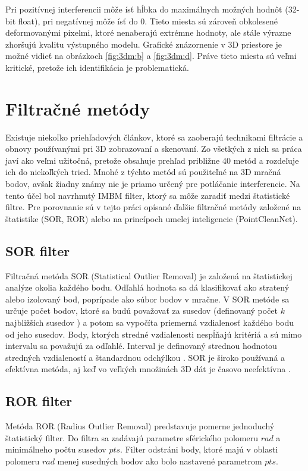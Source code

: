 Pri pozitívnej interferencii môže ísť hĺbka do maximálnych možných hodnôt (32-bit float), pri negatívnej môže ísť do 0. Tieto miesta sú zároveň obkolesené deformovanými pixelmi, ktoré nenaberajú extrémne hodnoty, ale stále výrazne zhoršujú kvalitu výstupného modelu. Grafické znázornenie v 3D priestore je možné vidieť na obrázkoch \ref{fig:3dm:b} a \ref{fig:3dm:d}. Práve tieto miesta sú veľmi kritické, pretože ich identifikácia je problematická. 

\section{Filtračné metódy}
\label{sec:filtmethods}

Existuje niekoľko priehľadových článkov, ktoré sa zaoberajú technikami filtrácie a obnovy používanými pri 3D zobrazovaní a skenovaní. Zo všetkých z nich sa práca \cite{Han} javí ako veľmi užitočná, pretože obsahuje prehľad približne 40 metód a rozdeľuje ich do niekoľkých tried. Mnohé z týchto metód sú použiteľné na 3D mračná bodov, avšak žiadny známy nie je priamo určený pre potláčanie interferencie. Na tento účel bol navrhnutý IMBM filter, ktorý sa môže zaradiť medzi štatistické filtre. Pre porovnanie sú v tejto práci opísané ďalšie filtračné metódy založené na štatistike (SOR, ROR) alebo na princípoch umelej inteligencie (PointCleanNet).   

\subsection{SOR filter}

Filtračná metóda SOR (Statistical Outlier Removal) je založená na štatistickej analýze okolia každého bodu. Odľahlá hodnota sa dá klasifikovať ako stratený alebo izolovaný bod, poprípade ako súbor bodov v mračne. V SOR metóde sa určuje počet bodov, ktoré sa budú považovať za susedov (definovaný počet $k$ najbližších susedov \cite{Pirate}) a potom sa vypočíta priemerná vzdialenosť každého bodu od jeho susedov. Body, ktorých stredné vzdialenosti nespĺňajú kritériá a sú mimo intervalu sa považujú za odľahlé. Interval je definovaný strednou hodnotou stredných vzdialeností a štandardnou odchýlkou \cite{Corso}. SOR je široko používaná a efektívna metóda, aj keď vo veľkých množinách 3D dát je časovo neefektívna  \cite{Balite}.

\subsection{ROR filter}
Metóda ROR (Radius Outlier Removal) predstavuje pomerne jednoduchý štatistický filter. Do filtra sa zadávajú parametre sférického polomeru $rad$ a minimálneho počtu susedov $pts$. Filter odstráni body, ktoré majú v oblasti polomeru $rad$ menej susedných bodov ako bolo nastavené parametrom $pts$.


